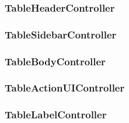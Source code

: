 \subsubsection{TableHeaderController}
\subsubsection{TableSidebarController}
\subsubsection{TableBodyController}
\subsubsection{TableActionUIController}
\subsubsection{TableLabelController}








